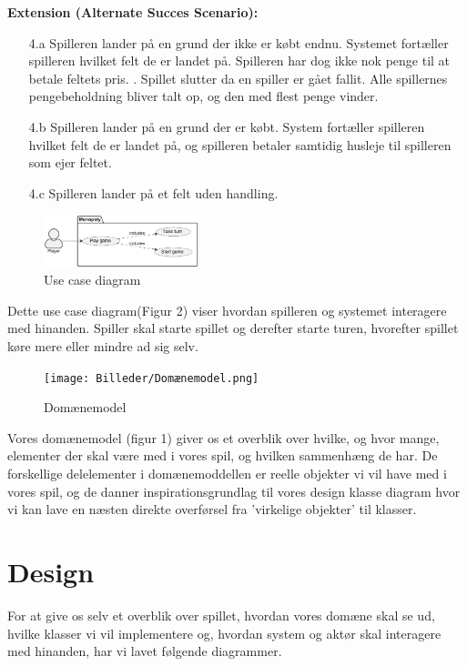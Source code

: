 \documentclass{article}
\begin{document}
\textbf{Extension (Alternate Succes Scenario): }
\begin{enumerate}
    \item [4.a] Spilleren lander på en grund der ikke er købt endnu. Systemet fortæller spilleren hvilket felt de er landet på. Spilleren har dog ikke nok penge til at betale feltets pris.
    . Spillet slutter da en spiller er gået fallit. Alle spillernes pengebeholdning bliver talt op, og den med flest penge vinder.
    \item [4.b] Spilleren lander på en grund der er købt. System fortæller spilleren hvilket felt de er landet på, og spilleren betaler samtidig husleje til spilleren som ejer feltet.
    \item [4.c] Spilleren lander på et felt uden handling.
\end{enumerate}

\begin{figure} [h]
    \centering
    \includegraphics[width = 0.4\textwidth]{Billeder/Usecasediagram.png}
    \caption{Use case diagram}
    \label{Use case diagram}
\end{figure}
Dette use case diagram(Figur 2) viser hvordan spilleren og systemet interagere med hinanden. Spiller skal starte spillet og derefter starte turen, hvorefter spillet køre mere eller mindre ad sig selv. 
\\

\begin{figure} [h]
    \centering
    \texttt{[image: Billeder/Domænemodel.png]}
    \caption{Domænemodel}
    \label{Domænemodel}
\end{figure}

Vores domænemodel (figur 1) giver os et overblik over hvilke, og hvor mange, elementer der skal være med i vores spil, og hvilken sammenhæng de har. De forskellige delelementer i domænemoddellen er reelle objekter vi vil have med i vores spil, og de danner inspirationsgrundlag til vores design klasse diagram hvor vi kan lave en næsten direkte overførsel fra 'virkelige objekter' til klasser.

\section{Design}
For at give os selv et overblik over spillet, hvordan vores domæne skal se ud, hvilke klasser vi vil implementere og, hvordan system og aktør skal interagere med hinanden, har vi lavet følgende diagrammer.
\\
\end{document}
